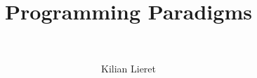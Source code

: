 %
\title{Programming Paradigms}
\subtitle{\ \relax}
\author{Kilian Lieret}
\newcommand*{\coauthors}{}
%
%
%
